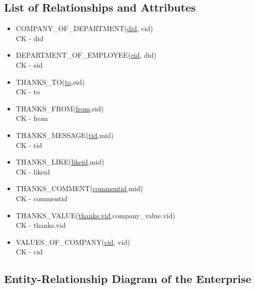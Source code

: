 \documentclass[11pt]{report}
\begin{document}
\subsection{List of Relationships and Attributes}
\begin{itemize}
\item COMPANY\_OF\_DEPARTMENT(\underline{did}, cid) \\
CK - did \\
\item DEPARTMENT\_OF\_EMPLOYEE(\underline{eid}, did) \\
CK - eid \\
\item THANKS\_TO(\underline{to},eid) \\
CK - to\\
\item THANKS\_FROM(\underline{from},eid) \\
CK - from\\
\item THANKS\_MESSAGE(\underline{tid},mid) \\
CK - tid\\
\item THANKS\_LIKE(\underline{likeid},mid) \\
CK - likeid\\
\item THANKS\_COMMENT(\underline{commentid},mid) \\
CK - commentid\\
\item THANKS\_VALUE(\underline{thanks.vid},company\_value.vid) \\
CK - thanks.vid\\
\item VALUES\_OF\_COMPANY(\underline{cid}, vid) \\
CK - cid
\end{itemize}
\clearpage

\subsection{Entity-Relationship Diagram of the Enterprise}
\end{document}
